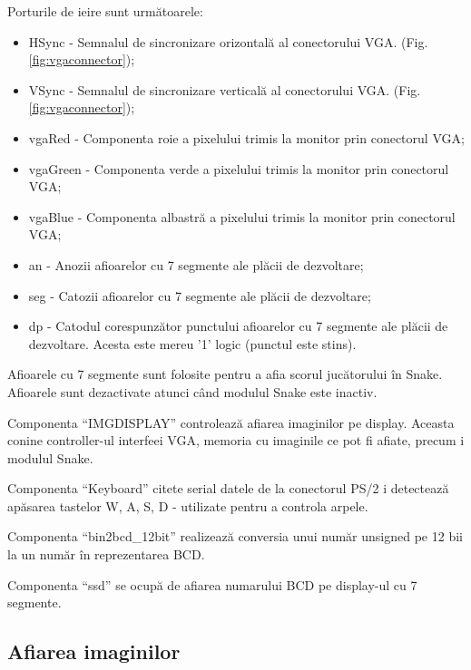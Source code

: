 \documentclass[a4paper,11pt,romanian]{article}
\begin{document}
{Porturile de ieire sunt urm\u{a}toarele:
\begin{itemize}
 \item HSync - Semnalul de sincronizare orizontal\u{a} al conectorului VGA. (Fig.\ref{fig:vgaconnector});
 \item VSync - Semnalul de sincronizare vertical\u{a} al conectorului VGA. (Fig.\ref{fig:vgaconnector});
 \item vgaRed - Componenta roie a pixelului trimis la monitor prin conectorul VGA;
 \item vgaGreen - Componenta verde a pixelului trimis la monitor prin conectorul VGA;
 \item vgaBlue - Componenta albastr\u{a} a pixelului trimis la monitor prin conectorul VGA;
 \item an - Anozii afioarelor cu 7 segmente ale pl\u{a}cii de dezvoltare;
 \item seg - Catozii afioarelor cu 7 segmente ale pl\u{a}cii de dezvoltare;
 \item dp - Catodul corespunz\u{a}tor punctului afioarelor cu 7 segmente ale pl\u{a}cii de dezvoltare. Acesta este mereu '1' logic (punctul este stins).
\end{itemize}

Afioarele cu 7 segmente sunt folosite pentru a afia scorul juc\u{a}torului \^{i}n Snake. Afioarele sunt dezactivate atunci c\^{a}nd modulul Snake este inactiv.

Componenta ``IMGDISPLAY'' controleaz\u{a} afiarea imaginilor pe display. Aceasta conine controller-ul interfeei VGA, memoria cu imaginile ce pot fi afiate, precum i modulul Snake.

Componenta ``Keyboard'' citete serial datele de la conectorul PS/2 i detecteaz\u{a} ap\u{a}sarea tastelor W, A, S, D - utilizate pentru a controla arpele.

Componenta ``bin2bcd\_12bit'' realizeaz\u{a} conversia unui num\u{a}r unsigned pe 12 bii la un num\u{a}r \^{i}n reprezentarea BCD.

Componenta ``ssd'' se ocup\u{a} de afiarea numarului BCD pe display-ul cu 7 segmente.

\subsection{Afiarea imaginilor}

}
\end{document}
